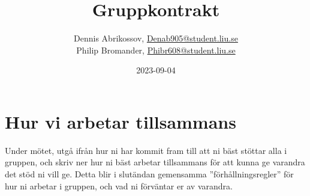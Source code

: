 \documentclass{mall}
\author{Dennis Abrikossov, \url{Denab905@student.liu.se}\\
Philip Bromander, \url{Phibr608@student.liu.se}}
\title{Gruppkontrakt}
\date{2023-09-04}
\begin{document}
\projectpage





\section{Hur vi arbetar tillsammans}


Under mötet, utgå ifrån hur ni har kommit fram till att ni bäst stöttar alla i gruppen, och skriv ner hur ni bäst arbetar tillsammans för att kunna ge varandra det stöd ni
vill ge. Detta blir i slutändan gemensamma ''förhållningsregler'' för hur ni arbetar i gruppen, och
vad ni förväntar er av varandra.
\end{document}
